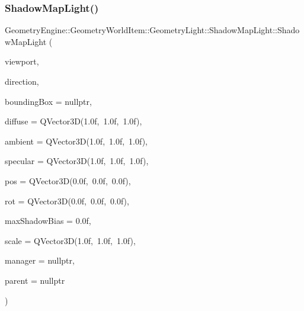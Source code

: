 \subsubsection{\texorpdfstring{ShadowMapLight()}{ShadowMapLight()}\hspace{0.1cm}{\footnotesize\ttfamily [1/2]}}
{\footnotesize\ttfamily Geometry\+Engine\+::\+Geometry\+World\+Item\+::\+Geometry\+Light\+::\+Shadow\+Map\+Light\+::\+Shadow\+Map\+Light (\begin{DoxyParamCaption}\item[{const \mbox{\hyperlink{class_geometry_engine_1_1_geometry_item_utils_1_1_viewport}{Geometry\+Item\+Utils\+::\+Viewport}} \&}]{viewport,  }\item[{const Q\+Vector3D \&}]{direction,  }\item[{\mbox{\hyperlink{class_geometry_engine_1_1_geometry_world_item_1_1_geometry_item_1_1_geometry_item}{Geometry\+Item\+::\+Geometry\+Item}} $\ast$}]{bounding\+Box = {\ttfamily nullptr},  }\item[{const Q\+Vector3D \&}]{diffuse = {\ttfamily QVector3D(1.0f,~1.0f,~1.0f)},  }\item[{const Q\+Vector3D \&}]{ambient = {\ttfamily QVector3D(1.0f,~1.0f,~1.0f)},  }\item[{const Q\+Vector3D \&}]{specular = {\ttfamily QVector3D(1.0f,~1.0f,~1.0f)},  }\item[{const Q\+Vector3D \&}]{pos = {\ttfamily QVector3D(0.0f,~0.0f,~0.0f)},  }\item[{const Q\+Vector3D \&}]{rot = {\ttfamily QVector3D(0.0f,~0.0f,~0.0f)},  }\item[{float}]{max\+Shadow\+Bias = {\ttfamily 0.0f},  }\item[{const Q\+Vector3D \&}]{scale = {\ttfamily QVector3D(1.0f,~1.0f,~1.0f)},  }\item[{const \mbox{\hyperlink{class_geometry_engine_1_1_light_utils_1_1_light_component_manager}{Light\+Utils\+::\+Light\+Component\+Manager}} $\ast$const}]{manager = {\ttfamily nullptr},  }\item[{\mbox{\hyperlink{class_geometry_engine_1_1_geometry_world_item_1_1_world_item}{World\+Item}} $\ast$}]{parent = {\ttfamily nullptr} }\end{DoxyParamCaption})}

